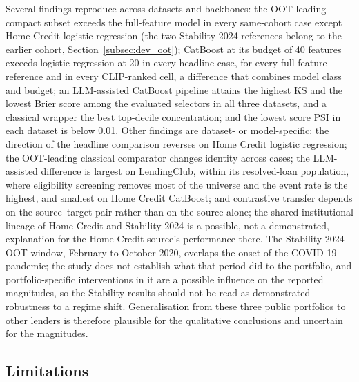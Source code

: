\documentclass[final,5p,twocolumn]{elsarticle}
\begin{document}
Several findings reproduce across datasets and backbones: the OOT-leading compact subset exceeds the full-feature model in every same-cohort case except Home Credit logistic regression (the two Stability 2024 references belong to the earlier cohort, Section~\ref{subsec:dev_oot}); CatBoost at its budget of 40 features exceeds logistic regression at 20 in every headline case, for every full-feature reference and in every CLIP-ranked cell, a difference that combines model class and budget; an LLM-assisted CatBoost pipeline attains the highest KS and the lowest Brier score among the evaluated selectors in all three datasets, and a classical wrapper the best top-decile concentration; and the lowest score PSI in each dataset is below 0.01. Other findings are dataset- or model-specific: the direction of the headline comparison reverses on Home Credit logistic regression; the OOT-leading classical comparator changes identity across cases; the LLM-assisted difference is largest on LendingClub, within its resolved-loan population, where eligibility screening removes most of the universe and the event rate is the highest, and smallest on Home Credit CatBoost; and contrastive transfer depends on the source--target pair rather than on the source alone; the shared institutional lineage of Home Credit and Stability 2024 is a possible, not a demonstrated, explanation for the Home Credit source's performance there. The Stability 2024 OOT window, February to October 2020, overlaps the onset of the COVID-19 pandemic; the study does not establish what that period did to the portfolio, and portfolio-specific interventions in it are a possible influence on the reported magnitudes, so the Stability results should not be read as demonstrated robustness to a regime shift. Generalisation from these three public portfolios to other lenders is therefore plausible for the qualitative conclusions and uncertain for the magnitudes.

\subsection{Limitations}
\label{subsec:limitations}
\end{document}
